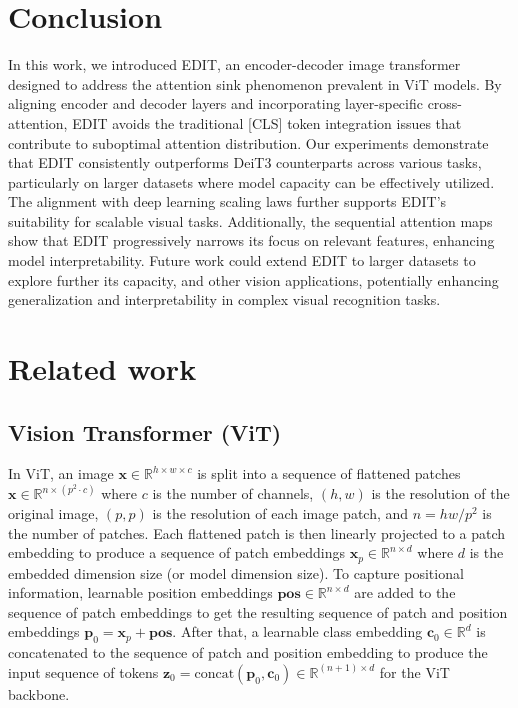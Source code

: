 \section{Conclusion}
In this work, we introduced EDIT, an encoder-decoder image transformer designed to address the attention sink phenomenon prevalent in ViT models. By aligning encoder and decoder layers and incorporating layer-specific cross-attention, EDIT avoids the traditional [CLS] token integration issues that contribute to suboptimal attention distribution. 
Our experiments demonstrate that EDIT consistently outperforms DeiT3 counterparts across various tasks, particularly on larger datasets where model capacity can be effectively utilized. 
The alignment with deep learning scaling laws further supports EDIT’s suitability for scalable visual tasks. 
Additionally, the sequential attention maps show that EDIT progressively narrows its focus on relevant features, enhancing model interpretability. Future work could extend EDIT to larger datasets to explore further its capacity, and other vision applications, potentially enhancing generalization and interpretability in complex visual recognition tasks.
\section{Related work}

\subsection{Vision Transformer (ViT)}
In ViT, an image $\mathbf{x} \in \mathbb{R} ^ {h \times w \times c}$ is split into a sequence of flattened patches $\mathbf{x} \in \mathbb{R} ^ {n \times (p^2 \cdot c)}$ where $c$ is the number of channels, $(h,w)$ is the resolution of the original image, $(p,p)$ is the resolution of each image patch, and $n=hw/p^2$ is the number of patches.
Each flattened patch is then linearly projected to a patch embedding to produce a sequence of patch embeddings $\mathbf{x}_p \in \mathbb{R} ^ {n \times d}$ where $d$ is the embedded dimension size (or model dimension size).
To capture positional information, learnable position embeddings $\mathbf{pos} \in \mathbb{R} ^ {n \times d}$ are added to the sequence of patch embeddings to get the resulting sequence of patch and position embeddings $\mathbf{p}_0 = \mathbf{x}_p + \mathbf{pos}$.
After that, a learnable class embedding $\mathbf{c}_0 \in \mathbb{R}^d$ is concatenated to the sequence of patch and position embedding to produce the input sequence of tokens $\mathbf{z}_0 = \mathrm{concat}(\mathbf{p}_0,  \mathbf{c}_0) \in \mathbb{R} ^ {(n+1) \times d}$ for the ViT backbone.

